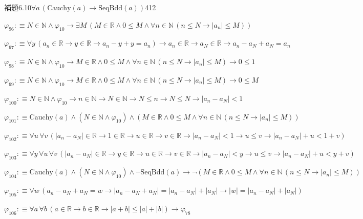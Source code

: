 \begin{fullproof}{補題6.10}{$\forall a\,(\mathrm{Cauchy}(a) \to \mathrm{SeqBdd}(a))$}{412}
\begin{abbrevlist}
\item $\varphi_{96} :\equiv N \in \mathbb{N} \land \varphi_{10} \to \exists M\,(M \in \mathbb{R} \land 0 \leq M \land \forall n \in \mathbb{N}\,(n \leq N \to \lvert a_{n} \rvert \leq M))$
\item $\varphi_{97} :\equiv \forall y\,(a_{n} \in \mathbb{R} \to y \in \mathbb{R} \to a_{n} - y + y = a_{n}) \to a_{n} \in \mathbb{R} \to a_{N} \in \mathbb{R} \to a_{n} - a_{N} + a_{N} = a_{n}$
\item $\varphi_{98} :\equiv N \in \mathbb{N} \land \varphi_{10} \to M \in \mathbb{R} \land 0 \leq M \land \forall n \in \mathbb{N}\,(n \leq N \to \lvert a_{n} \rvert \leq M) \to 0 \leq 1$
\item $\varphi_{99} :\equiv N \in \mathbb{N} \land \varphi_{10} \to M \in \mathbb{R} \land 0 \leq M \land \forall n \in \mathbb{N}\,(n \leq N \to \lvert a_{n} \rvert \leq M) \to 0 \leq M$
\item $\varphi_{100} :\equiv N \in \mathbb{N} \land \varphi_{10} \to n \in \mathbb{N} \to N \in \mathbb{N} \to N \leq n \to N \leq N \to \lvert a_{n} - a_{N} \rvert < 1$
\item $\varphi_{101} :\equiv \mathrm{Cauchy}(a) \land (N \in \mathbb{N} \land \varphi_{10}) \land (M \in \mathbb{R} \land 0 \leq M \land \forall n \in \mathbb{N}\,(n \leq N \to \lvert a_{n} \rvert \leq M))$
\item $\varphi_{102} :\equiv \forall u\,\forall v\,(\lvert a_{n} - a_{N} \rvert \in \mathbb{R} \to 1 \in \mathbb{R} \to u \in \mathbb{R} \to v \in \mathbb{R} \to \lvert a_{n} - a_{N} \rvert < 1 \to u \leq v \to \lvert a_{n} - a_{N} \rvert + u < 1 + v)$
\item $\varphi_{103} :\equiv \forall y\,\forall u\,\forall v\,(\lvert a_{n} - a_{N} \rvert \in \mathbb{R} \to y \in \mathbb{R} \to u \in \mathbb{R} \to v \in \mathbb{R} \to \lvert a_{n} - a_{N} \rvert < y \to u \leq v \to \lvert a_{n} - a_{N} \rvert + u < y + v)$
\item $\varphi_{104} :\equiv \mathrm{Cauchy}(a) \land (N \in \mathbb{N} \land \varphi_{10}) \land \neg \mathrm{SeqBdd}(a) \to \neg (M \in \mathbb{R} \land 0 \leq M \land \forall n \in \mathbb{N}\,(n \leq N \to \lvert a_{n} \rvert \leq M))$
\item $\varphi_{105} :\equiv \forall w\,(a_{n} - a_{N} + a_{N} = w \to \lvert a_{n} - a_{N} + a_{N} \rvert = \lvert a_{n} - a_{N} \rvert + \lvert a_{N} \rvert \to \lvert w \rvert = \lvert a_{n} - a_{N} \rvert + \lvert a_{N} \rvert)$
\item $\varphi_{106} :\equiv \forall a\,\forall b\,(a \in \mathbb{R} \to b \in \mathbb{R} \to \lvert a + b \rvert \leq \lvert a \rvert + \lvert b \rvert) \to \varphi_{78}$

\end{abbrevlist}
\end{fullproof}

